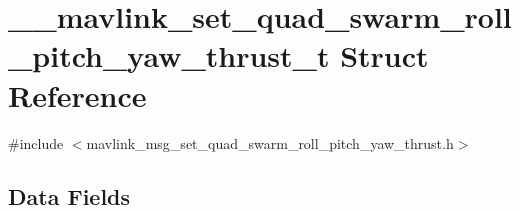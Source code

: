 \hypertarget{struct____mavlink__set__quad__swarm__roll__pitch__yaw__thrust__t}{\section{\-\_\-\-\_\-mavlink\-\_\-set\-\_\-quad\-\_\-swarm\-\_\-roll\-\_\-pitch\-\_\-yaw\-\_\-thrust\-\_\-t Struct Reference}
\label{struct____mavlink__set__quad__swarm__roll__pitch__yaw__thrust__t}
}


{\ttfamily \#include $<$mavlink\-\_\-msg\-\_\-set\-\_\-quad\-\_\-swarm\-\_\-roll\-\_\-pitch\-\_\-yaw\-\_\-thrust.\-h$>$}

\subsection*{Data Fields}
